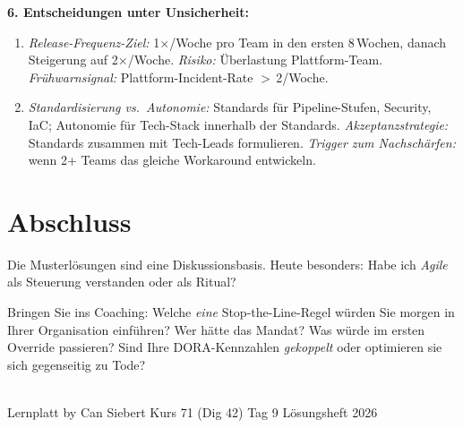 \documentclass[11pt,a4paper,oneside]{article}
\begin{document}
\begin{loesungbox}
\smallskip
\textbf{6. Entscheidungen unter Unsicherheit:}
\begin{enumerate}
  \item \emph{Release-Frequenz-Ziel:} 1$\times$/Woche pro Team in den ersten 8\,Wochen, danach Steigerung auf 2$\times$/Woche. \emph{Risiko:} \"Uberlastung Plattform-Team. \emph{Fr\"uhwarnsignal:} Plattform-Incident-Rate $>$\,2/Woche.
  \item \emph{Standardisierung vs.\ Autonomie:} Standards f\"ur Pipeline-Stufen, Security, IaC; Autonomie f\"ur Tech-Stack innerhalb der Standards. \emph{Akzeptanzstrategie:} Standards zusammen mit Tech-Leads formulieren. \emph{Trigger zum Nachsch\"arfen:} wenn 2+ Teams das gleiche Workaround entwickeln.
\end{enumerate}
\end{loesungbox}

\clearpage

\section*{Abschluss}
\thispagestyle{plain}

\noindent Die Musterl\"osungen sind eine Diskussionsbasis. Heute besonders: Habe ich \emph{Agile} als Steuerung verstanden \textendash{} oder als Ritual?

\medskip
\begin{infobox}
Bringen Sie ins Coaching: Welche \emph{eine} Stop-the-Line-Regel w\"urden Sie morgen in Ihrer Organisation einf\"uhren? Wer h\"atte das Mandat? Was w\"urde im ersten Override passieren? Sind Ihre DORA-Kennzahlen \emph{gekoppelt} \textendash{} oder optimieren sie sich gegenseitig zu Tode?
\end{infobox}

\vspace{1cm}
\noindent{\color{lpAccent}\rule{\linewidth}{0.6pt}}\\[4pt]
{\footnotesize\sffamily\color{lpGray}Lernplatt \textperiodcentered{} by Can Siebert \textperiodcentered{} Kurs 71 (Dig 42) \textperiodcentered{} Tag 9 \textperiodcentered{} L\"osungsheft \textperiodcentered{} \textcopyright{} 2026}
\end{document}
